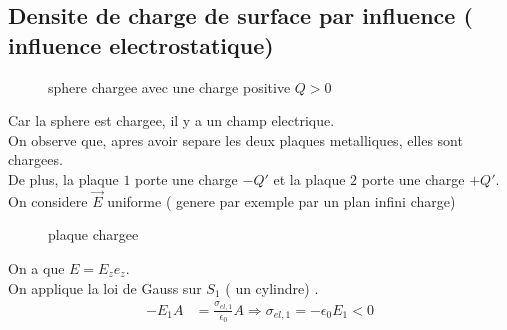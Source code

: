 \documentclass[../main.tex]{subfiles}
\begin{document}
\subsection{Densite de charge de surface par influence ( influence electrostatique) }
\begin{exemple}
\begin{figure}[H]
    \centering
    \caption{sphere chargee avec une charge positive $Q>0$}
    \label{fig:sphere-chargee-2}
\end{figure}
Car la sphere est chargee, il y a un champ electrique.\\
On observe que, apres avoir separe les deux plaques metalliques, elles sont chargees.\\
De plus, la plaque $1$ porte une charge $-Q'$ et la plaque $2$ porte une charge $+ Q'$.\\
On considere $\vec{E}$ uniforme ( genere par exemple par un plan infini charge) 
\begin{figure}[H]
    \centering
    \caption{plaque chargee}
    \label{fig:plaque-chargee}
\end{figure}
On a que $E = E_z e_z$.\\
On applique la loi de Gauss sur $S_1$ (  un cylindre) .
\begin{align*}
- E_1 A &= \frac{\sigma_{el,1} }{\epsilon_0} A \Rightarrow  \sigma_{el,1}  = - \epsilon_0 E_1 <0
\end{align*}


\end{exemple}
\end{document}
